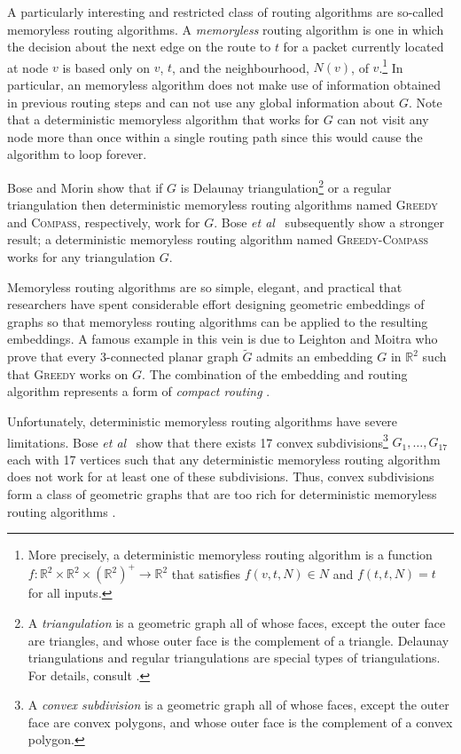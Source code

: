 \documentclass [letterpaper] {patmorin}
\newcommand{\R}{\mathbb{R}}
\newcommand{\etal}{\emph{et al}}
\begin{document}
A particularly interesting and restricted class of routing algorithms are so-called memoryless routing algorithms.  A \emph{memoryless} routing algorithm is one in which the decision about the next edge on the route to $t$ for a packet currently located at node $v$ is based only on $v$, $t$, and the neighbourhood, $N(v)$, of $v$.\footnote{More precisely, a deterministic memoryless routing algorithm is a function $f:\R^2\times\R^2\times(\R^2)^+\rightarrow \R^2$ that satisfies $f(v,t,N) \in N$ and $f(t,t,N) = t$ for all inputs.}  In particular, an memoryless algorithm does not make use of information obtained in previous routing steps and can not use any global information about $G$.  Note that a deterministic memoryless algorithm that works for $G$ can not visit any node more than once within a single routing path since this would cause the algorithm to loop forever.

Bose and Morin \cite{bose04} show that if $G$ is Delaunay triangulation\footnote{A \emph{triangulation} is a geometric graph all of whose faces, except the outer face are triangles, and whose outer face is the complement of a triangle. Delaunay triangulations and regular triangulations are special types of triangulations. For details, consult \cite{obs92}.} or a regular triangulation then deterministic memoryless routing algorithms named \textsc{Greedy} and \textsc{Compass}, respectively, work for $G$. Bose \etal\ \cite{bose02} subsequently show a stronger result; a deterministic memoryless routing algorithm named \textsc{Greedy-Compass} works for any triangulation $G$.

Memoryless routing algorithms are so simple, elegant, and practical that researchers have spent considerable effort designing geometric embeddings of graphs so that memoryless routing algorithms can be applied to the resulting embeddings.  A famous example in this vein is due to Leighton and Moitra \cite{lm08} who prove that every 3-connected planar graph $\tilde G$ admits an embedding $G$ in $\R^2$ such that \textsc{Greedy} works on $G$.  The combination of the embedding and routing algorithm represents a form of \emph{compact routing} \cite{l94}.

Unfortunately, deterministic memoryless routing algorithms have severe limitations.  Bose \etal\ \cite[Theorem~2]{bose04} show that there exists 17 convex subdivisions\footnote{A \emph{convex subdivision} is a geometric graph all of whose faces, except the outer face are convex polygons, and whose outer face is the complement of a convex polygon.} $G_1,\ldots,G_{17}$ each with 17 vertices such that any deterministic memoryless routing algorithm does not work for at least one of these subdivisions.  Thus, convex subdivisions form a class of geometric graphs that are too rich for deterministic memoryless routing algorithms \cite{bose02}.
\end{document}
